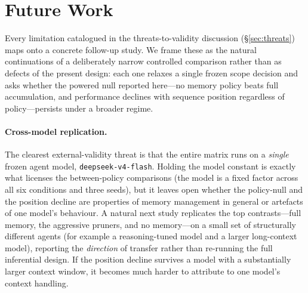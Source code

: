 

\section{Future Work}

Every limitation catalogued in the threats-to-validity discussion (\S\ref{sec:threats}) maps onto a concrete follow-up study. We frame these as the natural continuations of a deliberately narrow controlled comparison rather than as defects of the present design: each one relaxes a single frozen scope decision and asks whether the powered null reported here---no memory policy beats full accumulation, and performance declines with sequence position regardless of policy---persists under a broader regime.

\paragraph{Cross-model replication.}
The clearest external-validity threat is that the entire matrix runs on a \emph{single} frozen agent model, \texttt{deepseek-v4-flash}. Holding the model constant is exactly what licenses the between-policy comparisons (the model is a fixed factor across all six conditions and three seeds), but it leaves open whether the policy-null and the position decline are properties of memory management in general or artefacts of one model's behaviour. A natural next study replicates the top contrasts---full memory, the aggressive pruners, and no memory---on a small set of structurally different agents (for example a reasoning-tuned model and a larger long-context model), reporting the \emph{direction} of transfer rather than re-running the full inferential design. If the position decline survives a model with a substantially larger context window, it becomes much harder to attribute to one model's context handling.

